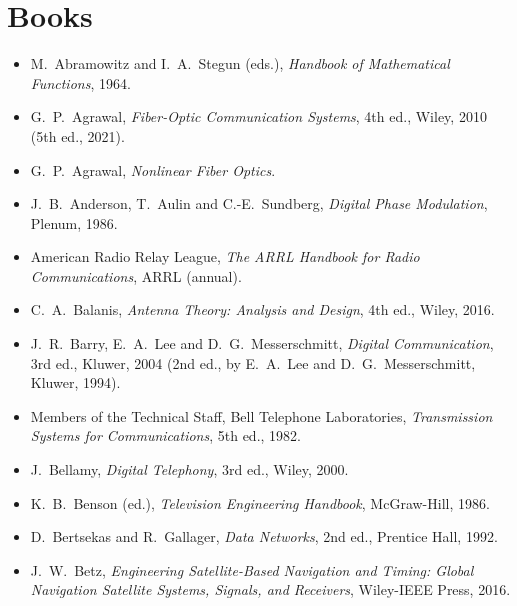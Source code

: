 \section*{Books}
\begingroup\small
\begin{itemize}[leftmargin=1.5em,itemindent=-1.5em,itemsep=1.5pt plus 1pt,parsep=0pt,topsep=4pt,label={}]\rightskip=0pt plus 3em\relax
\item M.~Abramowitz and I.~A.~Stegun (eds.), \emph{Handbook of Mathematical Functions}, 1964.
\item G.~P.~Agrawal, \emph{Fiber-Optic Communication Systems}, 4th ed., Wiley, 2010 (5th ed., 2021).
\item G.~P.~Agrawal, \emph{Nonlinear Fiber Optics}.
\item J.~B.~Anderson, T.~Aulin and C.-E.~Sundberg, \emph{Digital Phase Modulation}, Plenum, 1986.
\item American Radio Relay League, \emph{The ARRL Handbook for Radio Communications}, ARRL (annual).
\item C.~A.~Balanis, \emph{Antenna Theory: Analysis and Design}, 4th ed., Wiley, 2016.
\item J.~R.~Barry, E.~A.~Lee and D.~G.~Messerschmitt, \emph{Digital Communication}, 3rd ed., Kluwer, 2004 (2nd ed., by E.~A.~Lee and D.~G.~Messerschmitt, Kluwer, 1994).
\item Members of the Technical Staff, Bell Telephone Laboratories, \emph{Transmission Systems for Communications}, 5th ed., 1982.
\item J.~Bellamy, \emph{Digital Telephony}, 3rd ed., Wiley, 2000.
\item K.~B.~Benson (ed.), \emph{Television Engineering Handbook}, McGraw-Hill, 1986.
\item D.~Bertsekas and R.~Gallager, \emph{Data Networks}, 2nd ed., Prentice Hall, 1992.
\item J.~W.~Betz, \emph{Engineering Satellite-Based Navigation and Timing: Global Navigation Satellite Systems, Signals, and Receivers}, Wiley-IEEE Press, 2016.

\end{itemize}
